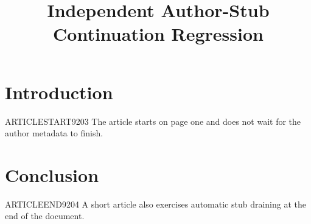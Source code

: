 \documentclass{tnqjournal}
\title{Independent Author-Stub Continuation Regression}
\begin{document}
\maketitle
\section{Introduction}
ARTICLESTART9203 The article starts on page one and does not wait for the author metadata to finish.
\section{Conclusion}
ARTICLEEND9204 A short article also exercises automatic stub draining at the end of the document.
\end{document}
